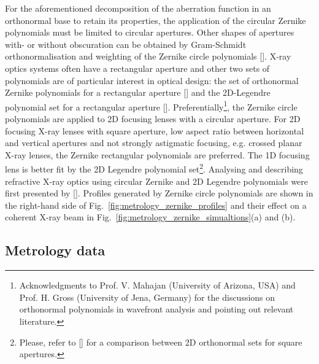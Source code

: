 \begin{refsection}
For the aforementioned decomposition of the aberration function in an orthonormal base to retain its properties, the application of the circular Zernike polynomials must be limited to circular apertures. Other shapes of apertures with- or without obscuration can be obtained by Gram-Schmidt orthonormalisation and weighting of the Zernike circle polynomials [\cite{Swantner1994,Mahajan1995}]. X-ray optics systems often have a rectangular aperture and other two sets of polynomials are of particular interest in optical design: the set of orthonormal Zernike polynomials for a rectangular aperture  [\cite{Mahajan2007}] and the 2D-Legendre polynomial set for a rectangular aperture [\cite{Mahajan2010}]. Preferentially\footnote{Acknowledgments to Prof. V. Mahajan (University of Arizona, USA) and Prof. H. Gross (University of Jena, Germany) for the discussions on orthonormal polynomials in wavefront analysis and pointing out relevant literature.}, the Zernike circle polynomials are applied to 2D focusing lenses with a circular aperture. For 2D focusing X-ray lenses with square aperture, low aspect ratio between horizontal and vertical apertures and not strongly astigmatic focusing, e.g. crossed planar X-ray lenses, the Zernike rectangular polynomials are preferred. The 1D focusing lens is better fit by the 2D Legendre polynomial set\footnote{Please, refer to [\cite{Ye2014}] for a comparison between 2D orthonormal sets for square apertures.}. Analysing and describing refractive X-ray optics using circular Zernike and 2D Legendre polynomials were first presented by [\cite{Koch2016}]. Profiles generated by Zernike circle polynomials are shown in the right-hand side of Fig.~\ref{fig:metrology_zernike_profiles} and their effect on a coherent X-ray beam in Fig.~\ref{fig:metrology_zernike_simualtions}(a) and (b).

\subsection{Metrology data}


\end{refsection}
